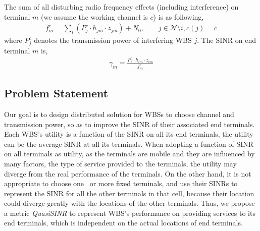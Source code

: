 The sum of all disturbing radio frequency effects (including interference) on terminal $m$ (we assume the working channel is $c$) is as following,
\begin{equation}
\label{interference}
\begin{aligned}
f_m^c=\sum_{\bar{i}} (P_{j}^c \cdot h_{jm} \cdot z_{jm}) +  N_0, \quad \quad j\in \mathcal{N}\setminus i, c(j) = c
\end{aligned}
\end{equation}
where $P_{j}^c$ denotes the transmission power of interfering WBS $j$.
The \gls{SINR} on end terminal $m$ is,
\begin{equation}
\label{SINR}
\begin{aligned}
\gamma_{m} = \frac{P_{i}^c \cdot h_{im}\cdot z_{im}} {f_m^c}
\end{aligned}
\end{equation}



\subsection{Problem Statement}
Our goal is to design distributed solution for WBSs to choose channel and transmission power, so as to improve the SINR of their associated end terminals.
Each WBS's utility is a function of the SINR on all its end terminals, \ie the utility can be the average SINR at all its terminals.
When adopting a function of SINR on all terminals as utility, as the terminals are mobile and they are influenced by many factors, \ie the type of service provided to the terminals, the utility may diverge from the real performance of the terminals.
On the other hand, it is not appropriate to choose one~\cite{spectrum_sharing_tvspace_2012} or more fixed terminals, and use their SINRs to represent the SINR for all the other terminals in that cell, because their location could diverge greatly with the locations of the other terminals.
Thus, we propose a metric \textit{QuasiSINR} to represent WBS's performance on providing services to its end terminals, which is independent on the actual locations of end terminals.


